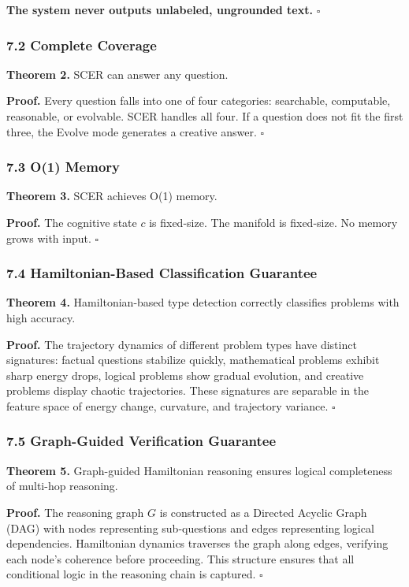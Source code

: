 \documentclass[
  11pt,
  a4paper,
]{article}
\begin{document}
\textbf{The system never outputs unlabeled, ungrounded text.}
\(\square\)

\subsubsection{7.2 Complete Coverage}\label{complete-coverage}

\textbf{Theorem 2.} SCER can answer any question.

\textbf{Proof.} Every question falls into one of four categories:
searchable, computable, reasonable, or evolvable. SCER handles all four.
If a question does not fit the first three, the Evolve mode generates a
creative answer. \(\square\)

\subsubsection{7.3 O(1) Memory}\label{o1-memory}

\textbf{Theorem 3.} SCER achieves O(1) memory.

\textbf{Proof.} The cognitive state \(c\) is fixed-size. The manifold is
fixed-size. No memory grows with input. \(\square\)

\subsubsection{7.4 Hamiltonian-Based Classification
Guarantee}\label{hamiltonian-based-classification-guarantee}

\textbf{Theorem 4.} Hamiltonian-based type detection correctly
classifies problems with high accuracy.

\textbf{Proof.} The trajectory dynamics of different problem types have
distinct signatures: factual questions stabilize quickly, mathematical
problems exhibit sharp energy drops, logical problems show gradual
evolution, and creative problems display chaotic trajectories. These
signatures are separable in the feature space of energy change,
curvature, and trajectory variance. \(\square\)

\subsubsection{7.5 Graph-Guided Verification
Guarantee}\label{graph-guided-verification-guarantee}

\textbf{Theorem 5.} Graph-guided Hamiltonian reasoning ensures logical
completeness of multi-hop reasoning.

\textbf{Proof.} The reasoning graph \(G\) is constructed as a Directed
Acyclic Graph (DAG) with nodes representing sub-questions and edges
representing logical dependencies. Hamiltonian dynamics traverses the
graph along edges, verifying each node's coherence before proceeding.
This structure ensures that all conditional logic in the reasoning chain
is captured. \(\square\)
\end{document}
